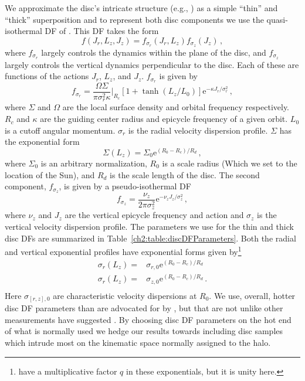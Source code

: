 We approximate the disc's intricate structure (e.g., \textcite{bovy12d}) as a simple ``thin'' and ``thick'' superposition and to represent both disc components we use the quasi-isothermal DF of \textcite{binney11} \parencite[see also ][]{binney10}. This DF takes the form
\begin{equation}
    f(J_{r},L_{z},J_{z}) = f_{\sigma_{r}}(J_{r},L_{z})f_{\sigma_{z}}(J_{z})\,,
\end{equation}
where $f_{\sigma_{r}}$ largely controls the dynamics within the plane of the disc, and $f_{\sigma_{z}}$ largely controls the vertical dynamics perpendicular to the disc. Each of these are functions of the actions $J_{r}$, $L_{z}$, and $J_{z}$. $f_{\sigma_{r}}$ is given by
\begin{equation}
    f_{\sigma_{r}} = \frac{\Omega \Sigma}{ \pi \sigma_{r}^{2} \kappa } \bigg \rvert_{R_{c}} [1 + \tanh(L_{z}/L_{0})] \mathrm{e}^{-\kappa J_{r} / \sigma_{r}^{2}}\,,
\end{equation}
where $\Sigma$ and $\Omega$ are the local surface density and orbital frequency respectively. $R_{c}$ and $\kappa$ are the guiding center radius and epicycle frequency of a given orbit. $L_{0}$ is a cutoff angular momentum. $\sigma_{r}$ is the radial velocity dispersion profile. $\Sigma$ has the exponential form
\begin{equation}
    \Sigma(L_{z}) = \Sigma_{0} \mathrm{e}^{(R_{0}-R_{c})/R_{d}}\,,
\end{equation}
where $\Sigma_{0}$ is an arbitrary normalization, $R_{0}$ is a scale radius (Which we set to the location of the Sun), and $R_{d}$ is the scale length of the disc.
The second component, $f_{\sigma_{z}}$, is given by a pseudo-isothermal DF
\begin{equation}
    f_{\sigma_{z}} =  \frac{\nu_{z}}{2\pi \sigma_{z}^{2}} \mathrm{e}^{-\nu_{z} J_{z}/\sigma_{z}^{2}}\,,
\end{equation}
where $\nu_{z}$ and $J_{z}$ are the vertical epicycle frequency and action and $\sigma_{z}$ is the vertical velocity dispersion profile. The parameters we use for the thin and thick disc DFs are summarized in Table~\ref{ch2:table:discDFParameters}. Both the radial and vertical exponential profiles have exponential forms given by\footnote{\textcite{binney11} have a multiplicative factor $q$ in these exponentials, but it is unity here.}
\begin{equation}
    \begin{split}
        \nonumber \sigma_{r}(L_{z}) = & \sigma_{r,0} \mathrm{e}^{(R_{0}-R_{c})/R_{d}} \\
        \sigma_{r}(L_{z}) = & \sigma_{z,0} \mathrm{e}^{(R_{0}-R_{c})/R_{d}}\,. \\
    \end{split}
\end{equation}
Here $\sigma_{[r,z],0}$ are characteristic velocity dispersions at $R_{0}$. We use, overall, hotter disc DF parameters than are advocated for by \textcite{binney11}, but that are not unlike other measurements have suggested \parencite[e.g. ][]{bovy12d,mackereth19b}. By choosing disc DF parameters on the hot end of what is normally used we hedge our results towards including disc samples which intrude most on the kinematic space normally assigned to the halo.

